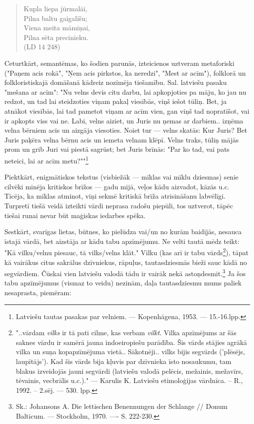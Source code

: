 \documentclass[11pt]{article}
\begin{document}
\begin{quote}
Kupla liepa jūrmalāi,\\
Pilna baltu gaigalīšu;\\
Viena meita māmiņai,\\
Pilna sēta precinieku.\\
(LD 14 248)
\end{quote}

Ceturtkārt, semantēmas, ko šodien parunās, izteicienos
uztveram metaforiski ("Paņem acis rokā",
"Ņem acis pirkstos, ka neredzi", "Mest ar acīm"),
folklorā un folkloristiskajā domāšanā kādreiz
nozīmēja tiešamību.
Sal. latviešu pasaku "mešana ar acīm":
"Nu velns devis citu darbu, lai apkopjoties pa māju,
ko jau nu redzot, un tad lai steidzoties viņam pakaļ
viesībās, viņš iešot tūliņ. Bet, ja atnākot viesībās,
lai tad pametot viņam ar acīm vien, gan viņš tad
nopratīšot, vai ir
apkopts viss vai ne.
Labi, velns aiziet, un Juris nu ņemas ar darbiem..
izņēma velna bērniem acis un aizgāja viesoties.
Noiet tur --- velns skatās: Kur Juris?
Bet Juris paķēra velna bērnu acis un iemeta velnam
klēpī. Velns traks, tūliņ mājās prom
un grib Juri vai piestā sagrūst; bet Juris brīnās:
"Par ko tad, vai pats neteici, lai ar acīm
metu?""\footnote{Latviešu tautas pasakas par
velniem. --- Kopenhāgena, 1953. --- 15.-16.lpp.}

Piektkārt, enigmātiskos tekstus (visbiežāk --- mīklas
vai mīklu dziesmas) senie cilvēki minēja kritiskos brīžos ---
gadu mijā, veļos kādu aizvadot, kāzās u.c.
Ticēja, ka mīklas atminot, viņi sekmē kritiskā brīža
atrisināšanu labvēlīgi. Turpretī tiešā veidā izteikti
vārdi neprasa radošu piepūli, tos uztverot, tāpēc
tiešai runai nevar būt maģiskas iedarbes spēka.

Sestkārt, svarīgas lietas, būtnes, ko pielūdza vai/un
no kurām baidījās, nesauca īstajā vārdā, bet aizstāja
ar kādu tabu apzīmējumu. Ne velti tautā mēdz teikt:
"Kā vilku/velnu piesauc, tā vilks/velns klāt."
Vilku (kas arī ir tabu vārds\footnote{"..vārdam {\em vilks}
ir tā pati cilme, kas verbam {\em vilkt}. Vilka
apzīmējums ar šās saknes vārdu ir samērā jauna
indoeiropiešu parādība. Šis vārds stājies agrākā vilka un
suņa kopapzīmējuma vietā.. Sākotnēji.. vilks bijis
segvārds ('plēsējs, laupītājs'). Kad šis vārds bija
kļuvis par dzīvnieka īsto nosaukumu, tam blakus izveidojās
jauni segvārdi (latviešu valodā pelēcis,
mežainis, mežavīrs, tēvainis, vecbrālis u.c.)." ---
Karulis K. Latviešu etimoloģijas vārdnīca. -- R., 1992. --
2.sēj. --- 530. lpp.}),
tāpat kā vairākus citus sakrālus dzīvniekus, rāpuļus,
tautasdziesmās bieži sauc kādā no segvārdiem. Čūskai vien
latviešu valodā tādu ir vairāk nekā
astoņdesmit.\footnote{Sk.: Johansons A. Die lettischen
Benennungen der Schlange // Donum Balticum. ---
Stockholm, 1970. ---- S. 222-230.}
Ja šos tabu apzīmējumus (vismaz to veidu) nezinām,
daļa tautasdziesmu mums paliek nesaprasta, piemēram:
\end{document}
